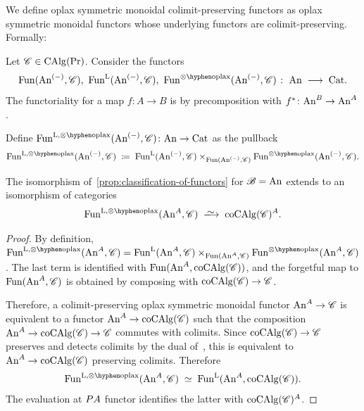 \documentclass[english,svgnames,table]{article}
\begin{document}
    We define oplax symmetric monoidal colimit-preserving functors as oplax symmetric monoidal functors whose underlying functors are colimit-preserving. Formally:
    \begin{definition}
        Let $\mathscr{C} \in \operatorname{CAlg}(\operatorname{Pr})$. Consider the functors
        \begin{equation*}
            \Fun(\An^{(-)}, \cC),\ \FunL(\An^{(-)}, \cC),\ \Funooplax(\An^{(-)}, \cC) \;\colon\; \An \;\too\; \Cat.
        \end{equation*}
        The functoriality for a map $f \colon A \to B$ is by precomposition with $f^* \colon \mathrm{An}^B \to \mathrm{An}^A$.

        Define $\FunLoplax(\An^{(-)}, \cC) \colon \An \to \Cat$ as the pullback 
        \begin{equation*}
            \FunLoplax(\An^{(-)}, \cC) \;\coloneq\; \FunL(\An^{(-)}, \cC) \times_{\Fun(\An^{(-)}, \cC)} \Funooplax(\An^{(-)}, \cC).
        \end{equation*}
    \end{definition}
    
    \begin{proposition}
    \label{prop:oplax-monoidal-and-coalgebras}
        The isomorphism of~\cref{prop:classification-of-functors} for $\mathscr{B}=\mathrm{An}$ extends to an isomorphism of categories
        \begin{equation*}
            \FunLoplax(\An^A, \cC) \;\isotoo\; \coCAlg(\cC)^A.
        \end{equation*}
    \end{proposition}
    \begin{proof}
        By definition, $\FunLoplax(\An^A, \cC) = \FunL(\An^A, \cC) \times_{\Fun(\An^A, \cC)} \Funooplax(\An^A, \cC)$. The last term is identified with $\operatorname{Fun}(\mathrm{An}^A, \operatorname{coCAlg}(\mathscr{C}))$, and the forgetful map to $\operatorname{Fun}(\mathrm{An}^A, \mathscr{C})$ is obtained by composing with $\operatorname{coCAlg}(\mathscr{C}) \to \mathscr{C}$.

        Therefore, a colimit-preserving oplax symmetric monoidal functor $\mathrm{An}^A \to \mathscr{C}$ is equivalent to a functor $\mathrm{An}^A \to \operatorname{coCAlg}(\mathscr{C})$ such that the composition $\mathrm{An}^A \to \operatorname{coCAlg}(\mathscr{C}) \to \mathscr{C}$ commutes with colimits. 
        Since $\operatorname{coCAlg}(\mathscr{C}) \to \mathscr{C}$ preserves and detects colimits by the dual of~\cite[Corollary~3.2.2.5]{Lurie-HA}, this is equivalent to $\mathrm{An}^A \to \operatorname{coCAlg}(\mathscr{C})$ preserving colimits.
        Therefore
        \begin{equation*}
            \FunLoplax(\An^A, \cC) \;\simeq\; \FunL(\An^A, \coCAlg(\cC)).
        \end{equation*}
        The evaluation at $P A$ functor identifies the latter with $\operatorname{coCAlg}(\mathscr{C})^A$. 
    \end{proof}
\end{document}
